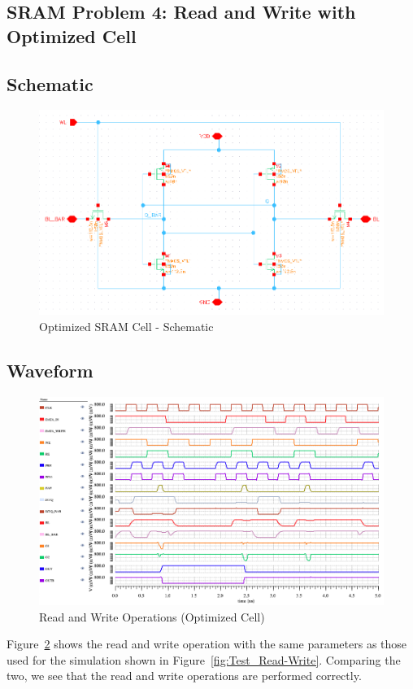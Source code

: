 \documentclass[10pt,letterpaper,onecolumn]{article}
\begin{document}
\clearpage
\begin{center}
\section{SRAM Problem 4: Read and Write with Optimized Cell}
\end{center}
\subsection{Schematic}
\begin{figure}[h!]
\centering
\includegraphics[clip,width=0.75\columnwidth]{sram_cell_schematic.png}
\caption{Optimized SRAM Cell - Schematic}
\label{fig:sram_sch_opt}
\end{figure}
\subsection{Waveform}
\begin{figure}[h!]
\centering
\includegraphics[clip,width=\columnwidth]{Problem4-TestRead-Write.png}
\caption{Read and Write Operations (Optimized Cell)}
\label{fig:Test_Read-Write_opt}
\end{figure}
Figure~\ref{fig:Test_Read-Write_opt} shows the read and write operation with the same parameters as those used for the simulation shown in Figure~\ref{fig:Test_Read-Write}. Comparing the two, we see that the read and write operations are performed correctly.
\end{document}
